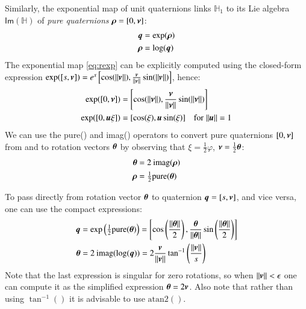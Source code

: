 Similarly, the exponential map of unit quaternions links $\mathbb{H}_1$ to its Lie algebra $\mathsf{Im}(\mathbb{H})$ of \emph{pure quaternions} ${\boldsymbol{\rho}} =  [0, {\boldsymbol{\nu}}]$:
%
\begin{align}
{\boldsymbol{q}}      &= \mathrm{exp}({\boldsymbol{\rho}}) \label{eq:rexp}\\
{\boldsymbol{\rho}} &= \mathrm{log}({\boldsymbol{q}})   \label{eq:rlog}
\end{align}
%
The exponential map \eqref{eq:rexp} can be explicitly computed using the closed-form expression 
$\exp([s,{\boldsymbol{v}}]) =  e^s \left[\cos(||{\boldsymbol{v}}||),\frac{{\boldsymbol{v}}}{||{\boldsymbol{v}}||}\sin(||{\boldsymbol{v}}||)\right]$, hence:
%
\begin{align}
\label{eq:at:quatexpa}
  \exp([0, {\boldsymbol{\nu}}]) &=  \left[\cos(||{\boldsymbol{\nu}}||),\frac{{\boldsymbol{\nu}}}{||{\boldsymbol{\nu}}||}\sin(||{\boldsymbol{\nu}}||)\right]   \\
\label{eq:at:quatexpb}
  \exp([0,{\boldsymbol{u}}\xi]) &=  [\cos(\xi),{\boldsymbol{u}}\sin(\xi)]  \quad  \text{for} \; ||{\boldsymbol{u}}||=1
\end{align}
%
We can use the  \textrm{pure}() and \textrm{imag}() operators to convert pure quaternions  $[0,{\boldsymbol{\nu}}]$ from and to rotation vectors ${\boldsymbol{\theta}}$ by observing that $\xi =  \frac{1}{2} \varphi$, ${\boldsymbol{\nu}} = \frac{1}{2} {\boldsymbol{\theta}}$: 
\begin{align}
    {\boldsymbol{\theta}}  &= 2 \: \text{imag}({\boldsymbol{\rho}})  \\
    {\boldsymbol{\rho}}    &= \tfrac{1}{2} \text{pure}({\boldsymbol{\theta}})  
    \end{align}

To pass directly from rotation vector ${\boldsymbol{\theta}}$ to quaternion ${\boldsymbol{q}}=[s,{\boldsymbol{v}}]$, and vice versa, one can use the compact expressions:
\begin{align}
{\boldsymbol{q}} &= 
\mathrm{exp} \left( \tfrac{1}{2} \text{pure}({\boldsymbol{\theta}}) \right) = 
\left[ 
\cos\left(\frac{||{\boldsymbol{\theta}}||}{2}\right), 
\frac{{\boldsymbol{\theta}} }{ ||{\boldsymbol{\theta}}|| } \sin\left( \frac{||{\boldsymbol{\theta}}||}{2}\right) 
\right] 
\label{eq:qexponential}  \\
{\boldsymbol{\theta}} &= 
2 \: \mathrm{imag} ( \text{log}({\boldsymbol{q}}) ) = 
2\frac{{\boldsymbol{v}}}{||{\boldsymbol{v}}||}\tan^{-1}\left(\frac{||{\boldsymbol{v}}||}{s}\right) 
\label{eq:qlogarithm}
\end{align} 
Note that the last expression is singular for zero rotations, so when $||{\boldsymbol{v}}|| < \epsilon$ one can compute it as the simplified expression ${\boldsymbol{\theta}} = 2 {\boldsymbol{v}}$. Also note that rather than using $\tan^{-1}()$ it is advisable to use $\mathrm{atan2}()$.

